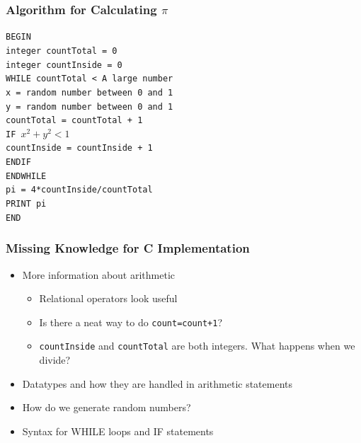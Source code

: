 \documentclass[14pt]{beamer}
\begin{document}
\begin{frame}
\frametitle{Algorithm for Calculating $\pi$}
{\footnotesize
\texttt{BEGIN\\
\quad integer countTotal = 0\\
\quad integer countInside = 0\\
\quad WHILE countTotal < A large number\\
\quad \quad x = random number between 0 and 1\\
\quad \quad y = random number between 0 and 1\\
\quad \quad countTotal = countTotal + 1\\
\quad \quad IF $x^2 + y^2 < 1$\\
\quad \quad \quad countInside = countInside + 1\\
\quad \quad ENDIF\\
\quad ENDWHILE\\
\quad pi = 4*countInside/countTotal\\
\quad PRINT pi\\
END\\
}
}
\end{frame}

\begin{frame}
\frametitle{Missing Knowledge for C Implementation}
\begin{itemize}
\item More information about arithmetic
\begin{itemize}
	\item Relational operators look useful
	\item Is there a neat way to do \texttt{count=count+1}?
	\item \texttt{countInside} and \texttt{countTotal} are both integers. What happens when we divide?
\end{itemize}
\item Datatypes and how they are handled in arithmetic statements
\item How do we generate random numbers?
\item Syntax for WHILE loops and IF statements
\end{itemize}
\end{frame}
\end{document}
